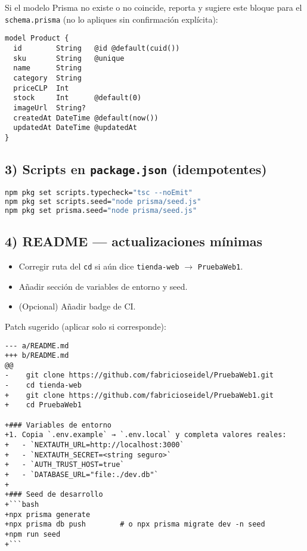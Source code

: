 \documentclass[11pt]{article}
\begin{document}
Si el modelo Prisma no existe o no coincide, reporta y sugiere este bloque para el \texttt{schema.prisma} (no lo apliques sin confirmación explícita):
\begin{lstlisting}
model Product {
  id        String   @id @default(cuid())
  sku       String   @unique
  name      String
  category  String
  priceCLP  Int
  stock     Int      @default(0)
  imageUrl  String?
  createdAt DateTime @default(now())
  updatedAt DateTime @updatedAt
}
\end{lstlisting}

\subsection*{3) Scripts en \texttt{package.json} (idempotentes)}
\begin{lstlisting}[language=bash]
npm pkg set scripts.typecheck="tsc --noEmit"
npm pkg set scripts.seed="node prisma/seed.js"
npm pkg set prisma.seed="node prisma/seed.js"
\end{lstlisting}

\subsection*{4) README — actualizaciones mínimas}
\begin{itemize}
  \item Corregir ruta del \texttt{cd} si aún dice \texttt{tienda-web} \(\rightarrow\) \texttt{PruebaWeb1}.
  \item Añadir sección de variables de entorno y seed.
  \item (Opcional) Añadir badge de CI.
\end{itemize}

\noindent
Patch sugerido (aplicar solo si corresponde):
\begin{lstlisting}
--- a/README.md
+++ b/README.md
@@
-    git clone https://github.com/fabricioseidel/PruebaWeb1.git
-    cd tienda-web
+    git clone https://github.com/fabricioseidel/PruebaWeb1.git
+    cd PruebaWeb1

+### Variables de entorno
+1. Copia `.env.example` → `.env.local` y completa valores reales:
+   - `NEXTAUTH_URL=http://localhost:3000`
+   - `NEXTAUTH_SECRET=<string seguro>`
+   - `AUTH_TRUST_HOST=true`
+   - `DATABASE_URL="file:./dev.db"`
+
+### Seed de desarrollo
+```bash
+npx prisma generate
+npx prisma db push        # o npx prisma migrate dev -n seed
+npm run seed
+```
\end{lstlisting}
\end{document}
